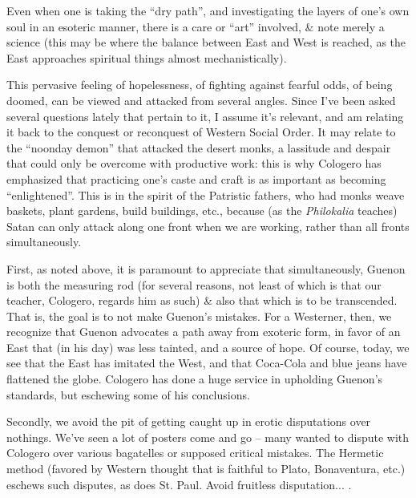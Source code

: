Even when one is taking the ``dry path'', and investigating the layers of one's own soul in an esoteric manner, there is a care or ``art'' involved, \& note merely a science (this may be where the balance between East and West is reached, as the East approaches spiritual things almost mechanistically).

This pervasive feeling of hopelessness, of fighting against fearful odds, of being doomed, can be viewed and attacked from several angles. Since I've been asked several questions lately that pertain to it, I assume it's relevant, and am relating it back to the conquest or reconquest of Western Social Order. It may relate to the ``noonday demon'' that attacked the desert monks, a lassitude and despair that could only be overcome with productive work: this is why Cologero has emphasized that practicing one's caste and craft is as important as becoming ``enlightened''. This is in the spirit of the Patristic fathers, who had monks weave baskets, plant gardens, build buildings, etc., because (as the \emph{Philokalia} teaches) Satan can only attack along one front when we are working, rather than all fronts simultaneously.

First, as noted above, it is paramount to appreciate that simultaneously, Guenon is both the measuring rod (for several reasons, not least of which is that our teacher, Cologero, regards him as such) \& also that which is to be transcended. That is, the goal is to not make Guenon's mistakes. For a Westerner, then, we recognize that Guenon advocates a path away from exoteric form, in favor of an East that (in his day) was less tainted, and a source of hope. Of course, today, we see that the East has imitated the West, and that Coca-Cola and blue jeans have flattened the globe. Cologero has done a huge service in upholding Guenon's standards, but eschewing some of his conclusions.

Secondly, we avoid the pit of getting caught up in erotic disputations over nothings. We've seen a lot of posters come and go -- many wanted to dispute with Cologero over various bagatelles or supposed critical mistakes. The Hermetic method (favored by Western thought that is faithful to Plato, Bonaventura, etc.) eschews such disputes, as does St. Paul. Avoid fruitless disputation... .

